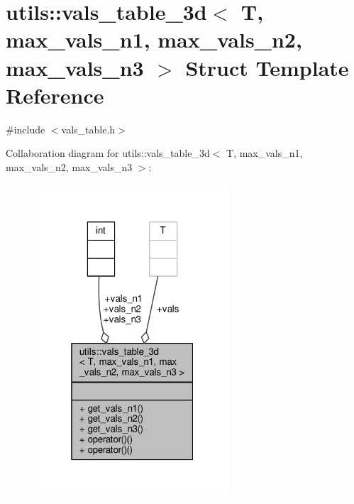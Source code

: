 \hypertarget{structutils_1_1vals__table__3d}{\section{utils\-:\-:vals\-\_\-table\-\_\-3d$<$ T, max\-\_\-vals\-\_\-n1, max\-\_\-vals\-\_\-n2, max\-\_\-vals\-\_\-n3 $>$ Struct Template Reference}
\label{structutils_1_1vals__table__3d}
}


{\ttfamily \#include $<$vals\-\_\-table.\-h$>$}



Collaboration diagram for utils\-:\-:vals\-\_\-table\-\_\-3d$<$ T, max\-\_\-vals\-\_\-n1, max\-\_\-vals\-\_\-n2, max\-\_\-vals\-\_\-n3 $>$\-:
\nopagebreak
\begin{figure}[H]
\begin{center}
\leavevmode
\includegraphics[width=208pt]{structutils_1_1vals__table__3d__coll__graph}
\end{center}
\end{figure}
